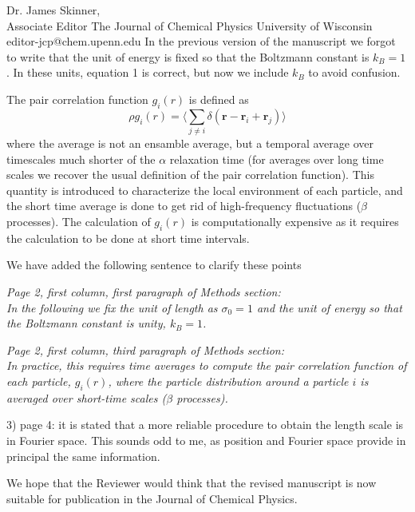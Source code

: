 \documentclass[a4paper, rebuttal, parskip=true, firsthead=false, fromemail=false, foldmarks=false]{scrlttr2}
\begin{document}
\begin{letter}{Dr. James Skinner,\\Associate Editor
The Journal of Chemical Physics
University of Wisconsin\\
editor-jcp@chem.upenn.edu }
In the previous version of the manuscript we forgot to write that the unit of energy is
fixed so that the Boltzmann constant is $k_B=1$. In these units, equation 1 is correct, but now we include
$k_B$ to avoid confusion.

The pair correlation function $g_i(r)$ is defined as
$$
\rho g_i(r)=\langle \sum_{j\neq i}\delta(\mathbf{r}-\mathbf{r}_i+\mathbf{r}_j)\rangle
$$
where the average is not an ensamble average, but a temporal average over timescales much shorter
of the $\alpha$ relaxation time (for averages over long time scales we recover the usual definition
of the pair correlation function). This quantity is introduced to characterize the local environment
of each particle, and the short time average is done to get rid of high-frequency fluctuations ($\beta$ processes).
The calculation of $ g_i(r)$ is computationally expensive as it requires the calculation to be done at short
time intervals.

We have added the following sentence to clarify these points

{\it Page 2, first column, first paragraph of Methods section:\\
In the following we fix the unit of length as $\sigma_0=1$ and the unit
of energy so that the Boltzmann constant is unity, $k_B=1$.
}

{\it Page 2, first column, third paragraph of Methods section:\\
In practice, this requires time averages to compute the pair correlation function of each particle, $g_i(r)$,
where the particle distribution around a particle $i$ is averaged over short-time scales ($\beta$ processes).
}

\begin{quotationi}
3) page 4: it is stated that a more reliable procedure to obtain the
length scale is in Fourier space. This sounds odd to me, as position and
Fourier space provide in principal the same information.
\end{quotationi}

We hope that the Reviewer would think that the revised manuscript is now suitable for publication in the Journal of Chemical Physics.



\end{letter} 
\end{document}

